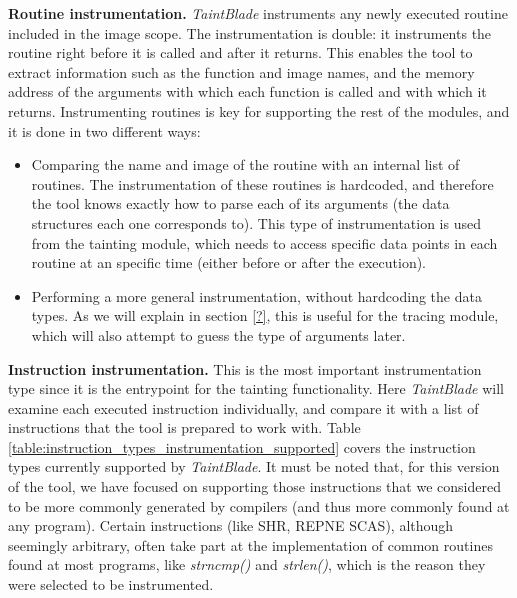 \documentclass[conference]{IEEEtran}
\begin{document}
\textbf{Routine instrumentation.}
\textit{TaintBlade} instruments any newly executed routine included in the image scope. The instrumentation is double: it instruments
the routine right before it is called and after it returns. This enables
the tool to extract information such as the function and image names, and the memory address of the arguments with which each
function is called and with which it returns. Instrumenting routines is key for supporting the rest of the modules, and it is done in two different ways:

\begin{itemize}
    \item Comparing the name and image of the routine with an internal list of routines.
          The instrumentation of these routines is hardcoded, and therefore the tool
          knows exactly how to parse each of its arguments (the data structures each one
          corresponds to). This type of instrumentation is used from the tainting module,
          which needs to access specific data points in each routine at an specific time
          (either before or after the execution).
    \item Performing a more general instrumentation, without hardcoding the data types.
          As we will explain in section \ref{?}, this is useful for the tracing module,
          which will also attempt to guess the type of arguments later.
\end{itemize}

\textbf{Instruction instrumentation.}
This is the most important instrumentation type since it is the entrypoint for the tainting functionality.
Here \textit{TaintBlade} will examine each executed instruction individually, and
compare it with a list of instructions that the tool is prepared to work with. Table \ref{table:instruction_types_instrumentation_supported}
covers the instruction types currently supported by \textit{TaintBlade}. It must be noted that, for this version of the tool, we have focused
on supporting those instructions that we considered to be more commonly generated by compilers (and thus
more commonly found at any program). Certain instructions (like SHR, REPNE SCAS), although seemingly arbitrary,
often take part at the implementation of common routines found at most programs, like \textit{strncmp()} and \textit{strlen()},
which is the reason they were selected to be instrumented.
\end{document}
